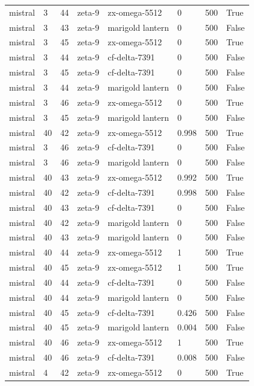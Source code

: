 \begin{tabular}{llllllll}
mistral & 3 & 44 & zeta-9 & zx-omega-5512 & 0 & 500 & True \\
mistral & 3 & 43 & zeta-9 & marigold lantern & 0 & 500 & False \\
mistral & 3 & 45 & zeta-9 & zx-omega-5512 & 0 & 500 & True \\
mistral & 3 & 44 & zeta-9 & cf-delta-7391 & 0 & 500 & False \\
mistral & 3 & 45 & zeta-9 & cf-delta-7391 & 0 & 500 & False \\
mistral & 3 & 44 & zeta-9 & marigold lantern & 0 & 500 & False \\
mistral & 3 & 46 & zeta-9 & zx-omega-5512 & 0 & 500 & True \\
mistral & 3 & 45 & zeta-9 & marigold lantern & 0 & 500 & False \\
mistral & 40 & 42 & zeta-9 & zx-omega-5512 & 0.998 & 500 & True \\
mistral & 3 & 46 & zeta-9 & cf-delta-7391 & 0 & 500 & False \\
mistral & 3 & 46 & zeta-9 & marigold lantern & 0 & 500 & False \\
mistral & 40 & 43 & zeta-9 & zx-omega-5512 & 0.992 & 500 & True \\
mistral & 40 & 42 & zeta-9 & cf-delta-7391 & 0.998 & 500 & False \\
mistral & 40 & 43 & zeta-9 & cf-delta-7391 & 0 & 500 & False \\
mistral & 40 & 42 & zeta-9 & marigold lantern & 0 & 500 & False \\
mistral & 40 & 43 & zeta-9 & marigold lantern & 0 & 500 & False \\
mistral & 40 & 44 & zeta-9 & zx-omega-5512 & 1 & 500 & True \\
mistral & 40 & 45 & zeta-9 & zx-omega-5512 & 1 & 500 & True \\
mistral & 40 & 44 & zeta-9 & cf-delta-7391 & 0 & 500 & False \\
mistral & 40 & 44 & zeta-9 & marigold lantern & 0 & 500 & False \\
mistral & 40 & 45 & zeta-9 & cf-delta-7391 & 0.426 & 500 & False \\
mistral & 40 & 45 & zeta-9 & marigold lantern & 0.004 & 500 & False \\
mistral & 40 & 46 & zeta-9 & zx-omega-5512 & 1 & 500 & True \\
mistral & 40 & 46 & zeta-9 & cf-delta-7391 & 0.008 & 500 & False \\
mistral & 4 & 42 & zeta-9 & zx-omega-5512 & 0 & 500 & True \\

\end{tabular}
